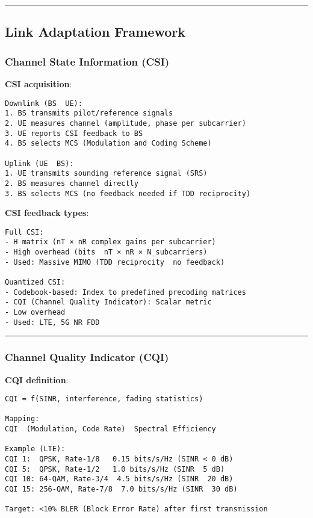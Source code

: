 \begin{center}\rule{0.5\linewidth}{0.5pt}\end{center}

\subsection{\texorpdfstring{ Link Adaptation
Framework}{ Link Adaptation Framework}}\label{link-adaptation-framework}

\subsubsection{Channel State Information
(CSI)}\label{channel-state-information-csi}

\textbf{CSI acquisition}:

\begin{verbatim}
Downlink (BS  UE):
1. BS transmits pilot/reference signals
2. UE measures channel (amplitude, phase per subcarrier)
3. UE reports CSI feedback to BS
4. BS selects MCS (Modulation and Coding Scheme)

Uplink (UE  BS):
1. UE transmits sounding reference signal (SRS)
2. BS measures channel directly
3. BS selects MCS (no feedback needed if TDD reciprocity)
\end{verbatim}

\textbf{CSI feedback types}:

\begin{verbatim}
Full CSI:
- H matrix (nT × nR complex gains per subcarrier)
- High overhead (bits  nT × nR × N_subcarriers)
- Used: Massive MIMO (TDD reciprocity  no feedback)

Quantized CSI:
- Codebook-based: Index to predefined precoding matrices
- CQI (Channel Quality Indicator): Scalar metric
- Low overhead
- Used: LTE, 5G NR FDD
\end{verbatim}

\begin{center}\rule{0.5\linewidth}{0.5pt}\end{center}

\subsubsection{Channel Quality Indicator
(CQI)}\label{channel-quality-indicator-cqi}

\textbf{CQI definition}:

\begin{verbatim}
CQI = f(SINR, interference, fading statistics)

Mapping:
CQI  (Modulation, Code Rate)  Spectral Efficiency

Example (LTE):
CQI 1:  QPSK, Rate-1/8   0.15 bits/s/Hz (SINR < 0 dB)
CQI 5:  QPSK, Rate-1/2   1.0 bits/s/Hz (SINR  5 dB)
CQI 10: 64-QAM, Rate-3/4  4.5 bits/s/Hz (SINR  20 dB)
CQI 15: 256-QAM, Rate-7/8  7.0 bits/s/Hz (SINR  30 dB)

Target: <10% BLER (Block Error Rate) after first transmission
\end{verbatim}


